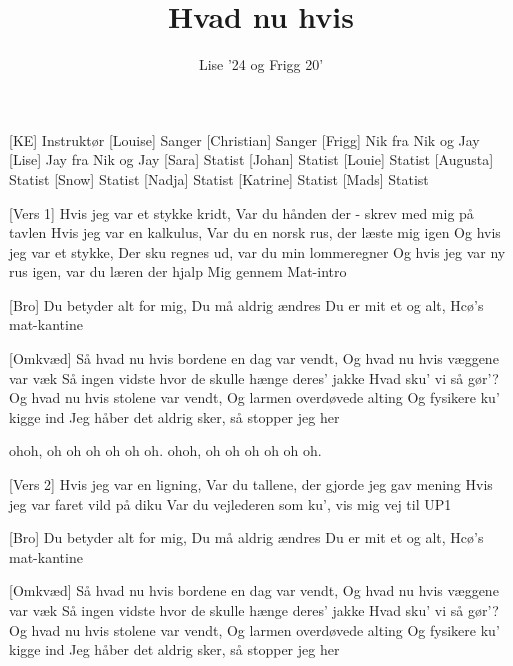\documentclass[a4paper,11pt]{article}
\title{Hvad nu hvis}
\author{Lise ’24 og Frigg 20’}
\begin{document}
\maketitle

\begin{roles}
[KE] Instruktør
[Louise] Sanger
[Christian] Sanger
[Frigg] Nik fra Nik og Jay
[Lise] Jay fra Nik og Jay
[Sara] Statist
[Johan] Statist
[Louie] Statist
[Augusta] Statist
[Snow] Statist
[Nadja] Statist
[Katrine] Statist
[Mads] Statist
\end{roles}


\begin{song}

[Vers 1] Hvis jeg var et stykke kridt,
Var du hånden der - skrev med mig på tavlen
Hvis jeg var en kalkulus,
Var du en norsk rus, der læste mig igen
Og hvis jeg var et stykke,
Der sku regnes ud, var du min lommeregner
Og hvis jeg var ny rus igen, var du læren der hjalp
Mig gennem Mat-intro

[Bro] Du betyder alt for mig,
Du må aldrig ændres
Du er mit et og alt,
Hcø’s mat-kantine

[Omkvæd] Så hvad nu hvis bordene en dag var vendt,
Og hvad nu hvis væggene var væk
Så ingen vidste hvor de skulle hænge deres’ jakke
Hvad sku’ vi så gør’?
Og hvad nu hvis stolene var vendt,
Og larmen overdøvede alting
Og fysikere ku’ kigge ind
Jeg håber det aldrig sker, så stopper jeg her

ohoh, oh oh oh oh oh oh. ohoh, oh oh oh oh oh oh.

[Vers 2] Hvis jeg var en ligning,
Var du tallene, der gjorde jeg gav mening
Hvis jeg var faret vild på diku
Var du vejlederen som ku’, vis mig vej til UP1

[Bro] Du betyder alt for mig,
Du må aldrig ændres
Du er mit et og alt,
Hcø’s mat-kantine

[Omkvæd] Så hvad nu hvis bordene en dag var vendt,
Og hvad nu hvis væggene var væk
Så ingen vidste hvor de skulle hænge deres’ jakke
Hvad sku’ vi så gør’?
Og hvad nu hvis stolene var vendt,
Og larmen overdøvede alting
Og fysikere ku’ kigge ind
Jeg håber det aldrig sker, så stopper jeg her


\end{song}
\end{document}
